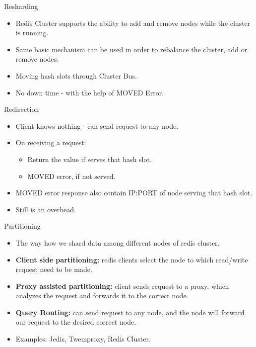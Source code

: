\documentclass{beamer}
\begin{document}
\begin{frame}{Resharding}
\begin{itemize}
    \item Redis Cluster supports the ability to add and remove nodes while the cluster is running.
    \item Same basic mechanism can be used in order to rebalance the cluster, add or remove nodes.
    \item Moving hash slots through Cluster Bus.
    \item No down time - with the help of MOVED Error.
\end{itemize}
\end{frame}

\begin{frame}{Redirection}
\begin{itemize}
    \item Client knows nothing - can send request to any node.
    \item On receiving a request:
        \begin{itemize}
            \item Return the value if serves that hash slot.
            \item MOVED error, if not served.
        \end{itemize}
    \item MOVED error response also contain IP:PORT of node serving that hash slot.
    \item Still is an overhead.
\end{itemize}
\end{frame}


\begin{frame}{Partitioning}
\begin{itemize}
    \item The way how we shard data among different nodes of redis cluster.
    \item \textbf{Client side partitioning:} redis clients select the node to which read/write request need to be made.
    \item \textbf{Proxy assisted partitioning:} client sends request to a proxy,
        which analyzes the request and forwards it to the correct node.
    \item \textbf{Query Routing:} can send request to any node, and the node
        will forward our request to the desired correct node.
    \item Examples: Jedis, Twemproxy, Redis Cluster. 
\end{itemize}
\end{frame}
\end{document}

